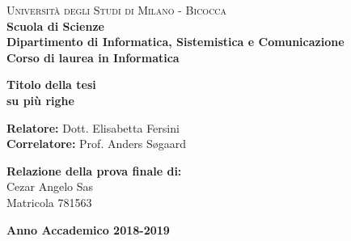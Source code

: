 \documentclass[a4paper,12pt, openright, oneside]{report}
\begin{document}
% 
\begin{titlepage}
        
    \noindent
    \begin{minipage}[t]{0.19\textwidth}
    \end{minipage}
    \begin{minipage}[t]{0.81\textwidth}
    {
            {\textsc{Università degli Studi di Milano - Bicocca}} \\
            \textbf{Scuola di Scienze} \\
            \textbf{Dipartimento di Informatica, Sistemistica e Comunicazione} \\
            \textbf{Corso di laurea in Informatica} \\
            \par
    }
    \end{minipage}
    
\vspace{40mm}
    
\begin{center}
        {\LARGE{
                \textbf{Titolo della tesi \\ su più righe}
                \par
        }}
    \end{center}
    
    \vspace{50mm}

    \noindent
    {\large \textbf{Relatore:} Dott. Elisabetta Fersini } \\

    \noindent
    {\large \textbf{Correlatore:} Prof. Anders S{\o}gaard}
        
    \vspace{15mm}

    \begin{flushright}
        {\large \textbf{Relazione della prova finale di:}} \\
        \large{Cezar Angelo Sas} \\
        \large{Matricola 781563} 
    \end{flushright}
        
    \vspace{40mm}
    \begin{center}
        {\large{\bf Anno Accademico 2018-2019}}
    \end{center}

    \restoregeometry
        
\end{titlepage}
\tableofcontents






\end{document}
